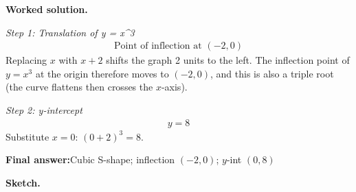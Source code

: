 \documentclass[11pt]{article}
\begin{document}
\textbf{Worked solution.}

\textit{Step 1: Translation of y = x\textasciicircum 3}
\[\begin{gathered}
\text{Point of inflection at } (-2, 0)
\end{gathered}\]
Replacing \( x \) with \( x + 2 \) shifts the graph 2 units to the left. The inflection point of \( y = x^3 \) at the origin therefore moves to \( (-2, 0) \), and this is also a triple root (the curve flattens then crosses the \( x \)-axis).

\textit{Step 2: y-intercept}
\[\begin{gathered}
y = 8
\end{gathered}\]
Substitute \( x = 0 \): \( (0+2)^3 = 8 \).

\begin{answerbox}
\textbf{Final answer:}\quad Cubic S-shape; inflection \(\displaystyle (-2,0)\); \(\displaystyle y\)-int \(\displaystyle (0,8)\)
\end{answerbox}
\textbf{Sketch.}
\end{document}
